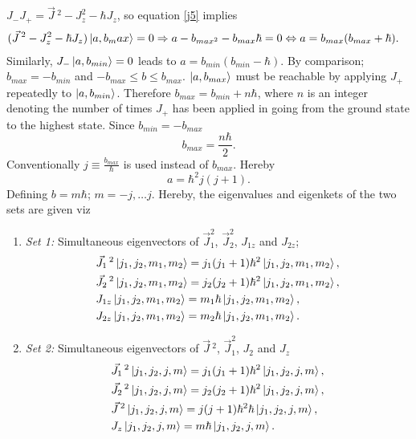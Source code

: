 $J_-J_+=\vec{J}\,^2-J_z^2-\hbar J_z$, so equation \eqref{j5} implies
\begin{equation}
	\begin{split}
		(\vec{J}\,^2-J_z^2-\hbar J_z)\ket{a,b{_max}}&=0\Rightarrow a-b_{max^2}-b_{max}\hbar=0\Leftrightarrow a=b_{max}(b_{max}+\hbar). 
	\end{split}
\end{equation} 
Similarly, $J_-\ket{a,b_{min}}=0$ leads to $a=b_{min}(b_{min}-\hbar)$. By comparison; $b_{max}=-b_{min}$ and $-b_{max}\leq b\leq b_{max}$. $\ket{a,b_{max}}$ must be reachable by applying $J_+$ repeatedly to $\ket{a,b_{min}}$. Therefore $b_{max}=b_{min}+n\hbar$, where $n$ is an integer denoting the number of times $J_+$ has been applied in going from the ground state to the highest state. Since $b_{min}=-b_{max}$
\begin{equation}
	b_{max}=\frac{n\hbar}{2}.
\end{equation}  
Conventionally $j\equiv \frac{b_{max}}{\hbar}$ is used instead of $b_{max}$. Hereby
\begin{equation}
	a=\hbar^2j(j+1).
\end{equation} 
Defining $b=m\hbar$; $m=-j,\dots j$. Hereby, the eigenvalues and eigenkets of the two sets are given viz
\begin{enumerate}
	\item \emph{Set 1:} Simultaneous eigenvectors of $\vec{J}_1^2$, $\vec{J}_2^2$, $J_{1z}$ and $J_{2z}$;
	\begin{equation}
		\begin{split}
			&\vec{J}_1\,^2\ket{j_1,j_2,m_1,m_2}=j_1(j_1+1)\hbar^2\ket{j_1,j_2,m_1,m_2},\\
			&\vec{J}_2\,^2\ket{j_1,j_2,m_1,m_2}=j_2(j_2+1)\hbar^2\ket{j_1,j_2,m_1,m_2},\\
			&J_{1z}\ket{j_1,j_2,m_1,m_2}=m_1\hbar\ket{j_1,j_2,m_1,m_2},\\
			&J_{2z}\ket{j_1,j_2,m_1,m_2}=m_2\hbar\ket{j_1,j_2,m_1,m_2}.\\
		\end{split}
	\end{equation} 
	
	\item \emph{Set 2:} Simultaneous eigenvectors of $\vec{J}\,^2$, $\vec{J}_1^2$, $J_{2}$ and $J_{z}$ 
	\begin{equation}
		\begin{split}
			&\vec{J}_1\,^2\ket{j_1,j_2,j,m}=j_1(j_1+1)\hbar^2\ket{j_1,j_2,j,m},\\
			&\vec{J}_2\,^2\ket{j_1,j_2,j,m}=j_2(j_2+1)\hbar^2\ket{j_1,j_2,j,m},\\
			&\vec{J}\,^2\ket{j_1,j_2,j,m}=j(j+1)\hbar^2\hbar\ket{j_1,j_2,j,m},\\
			&J_{z}\ket{j_1,j_2,j,m}=m\hbar\ket{j_1,j_2,j,m}.\\
		\end{split}
	\end{equation} 
	
\end{enumerate}


